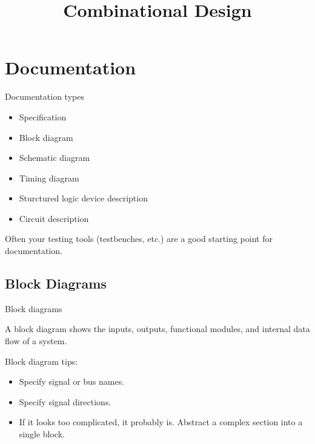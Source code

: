 \title{Combinational Design}

\section{Documentation}

\begin{frame}{Documentation types}
  \begin{itemize}
    \item Specification
    \item Block diagram
    \item Schematic diagram
    \item Timing diagram
    \item Sturctured logic device description
    \item Circuit description
  \end{itemize}
\end{frame}

Often your testing tools (testbenches, etc.) are a good starting point for documentation.

\subsection{Block Diagrams}

\begin{frame}{Block diagrams}
  \begin{definition}
    A \alert{block diagram} shows the inputs, outputs, functional modules, and internal data flow of a system.
  \end{definition}
  Block diagram tips:
  \begin{itemize}
    \item Specify signal or bus names.
    \item Specify signal directions.
    \item If it looks too complicated, it probably is.  Abstract a complex section into a single block.
  \end{itemize}
\end{frame}


